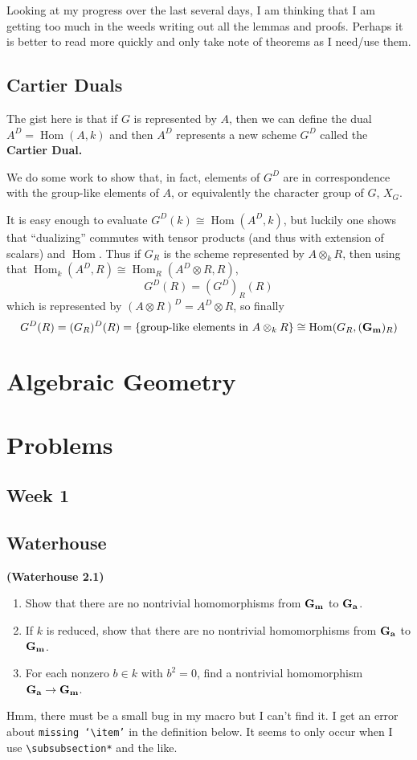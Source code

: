 \documentclass[12pt]{article}
\theoremstyle{nonumberbreak}
\theoremstyle{changebreak}
\theoremstyle{nonumberplain}
\theoremstyle{change}
\newenvironment{wprob}[1]{\begin{prob}{\normalfont\bfseries (Waterhouse #1) }\itshape}{\end{prob}}
\DeclareMathOperator{\Hom}{Hom}
\newcommand{\Ga}{\ensuremath\mathbf{G_a}}
\newcommand{\Gm}{\ensuremath\mathbf{G_m}}
\begin{document}
Looking at my progress over the last several days, I am thinking that I am getting
too much in the weeds writing out all the lemmas and proofs. Perhaps it is better to read more quickly
and only take note of theorems as I need/use them.

\subsection{Cartier Duals}
The gist here is that if $G$ is represented by $A$, then we can define the dual 
$A^D=\Hom(A,k)$ and then $A^D$ represents a new scheme $G^D$ called the \textbf{Cartier Dual.}

We do some work to show that, in fact, elements of $G^D$ are in correspondence with the 
group-like elements of $A$, or equivalently the character group of $G$, $X_G$.

It is easy enough to evaluate $G^D(k)\cong\Hom(A^D,k)$, but luckily one shows that
``dualizing'' commutes with tensor products (and thus with extension of scalars) and $\Hom$. Thus
if $G_R$ is the scheme represented by $A\otimes_k R$, then using that $\Hom_k(A^D,R)\cong\Hom_R(A^D\otimes R,R)$,
\[G^D(R)=(G^D)_R(R)\]
which is represented by $(A\otimes R)^D=A^D\otimes R$, so finally 
\[G^D(R)=(G_R)^D(R)=\{\text{group-like elements in }A\otimes_k R\}\cong \Hom(G_R,(\Gm)_R)\]

\newpage
\section{Algebraic Geometry}


\newpage
\section{Problems}
\subsection{Week 1}

\subsection{Waterhouse}
\begin{wprob}{2.1}
	\begin{enumerate}
		\item Show that there are no nontrivial homomorphisms from $\Gm$ to $\Ga$.
		\item If $k$ is reduced, show that there are no nontrivial homomorphisms from $\Ga$ to $\Gm$.
		\item For each nonzero $b\in k$ with $b^2=0$, find a nontrivial homomorphism $\Ga\to\Gm$.
	\end{enumerate}
\end{wprob}
Hmm, there must be a small bug in my macro but I can't find it. I get an error about \texttt{missing `\textbackslash item'}
in the definition below. It seems to only occur when I use \texttt{\textbackslash subsubsection*} and the like.
\end{document}
